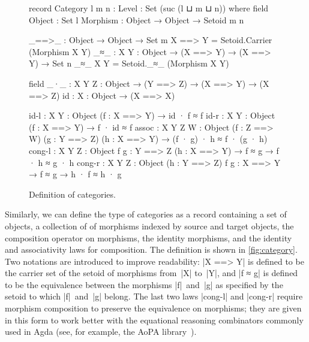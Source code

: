 \begin{figure}
\codefigure
\begin{code}
record Category {l m n : Level} : Set (suc (l ⊔ m ⊔ n)) where
  field
    Object    :  Set l
    Morphism  :  Object → Object → Setoid {m} {n}

  _==>_ : Object → Object → Set m
  X ==> Y = Setoid.Carrier (Morphism X Y)
  _≈_ : {X Y : Object} → (X ==> Y) → (X ==> Y) → Set n
  _≈_ {X} {Y} = Setoid._≈_ (Morphism X Y)

  field
    _·_  :   {X Y Z : Object} → (Y ==> Z) → (X ==> Y) → (X ==> Z)
    id   :   {X : Object} → (X ==> X)

    id-l    :  {X Y : Object} (f : X ==> Y) →
               id · f ≈ f
    id-r    :  {X Y : Object} (f : X ==> Y) →
               f · id ≈ f
    assoc   :  {X Y Z W : Object} (f : Z ==> W) (g : Y ==> Z) (h : X ==> Y) →
               (f · g) · h ≈ f · (g · h)
    cong-l  :  {X Y Z : Object} {f g : Y ==> Z} (h : X ==> Y) →
               f ≈ g → f · h ≈ g · h
    cong-r  :  {X Y Z : Object} (h : Y ==> Z) {f g : X ==> Y} →
               f ≈ g → h · f ≈ h · g
\end{code}
\caption{Definition of categories.}
\label{fig:category}
\end{figure}

Similarly, we can define the type of categories as a record containing a set of objects, a collection of  of morphisms indexed by source and target objects, the composition operator on morphisms, the identity morphisms, and the identity and associativity laws for composition.
The definition is shown in \autoref{fig:category}.
Two notations are introduced to improve readability: |X ==> Y| is defined to be the carrier set of the setoid of morphisms from~|X| to~|Y|, and |f ≈ g| is defined to be the equivalence between the morphisms |f|~and~|g| as specified by the setoid to which |f|~and~|g| belong.
The last two laws |cong-l| and |cong-r| require morphism composition to preserve the equivalence on morphisms; they are given in this form to work better with the equational reasoning combinators commonly used in Agda (see, for example, the AoPA library~\citep{Mu-AoPA}).

